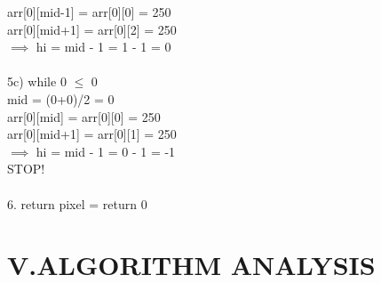 \documentclass[10pt]{article}
\begin{document}
\begin{multicols*}{2}
        arr[0][mid-1] = arr[0][0] = 250\\

        arr[0][mid+1] = arr[0][2] = 250\\
        
        $\implies$ hi = mid - 1 = 1 - 1 = 0\\\\5c) while 0 $\leq$ 0\\
    
        mid = (0+0)/2 = 0\\

        arr[0][mid] = arr[0][0] = 250\\

        arr[0][mid+1] = arr[0][1] = 250\\
        
        $\implies$ hi = mid - 1 = 0 - 1 = -1\\
        
        STOP!\\\\6. return pixel = return 0
\section*{V.ALGORITHM ANALYSIS}


\end{multicols*}
\end{document}
